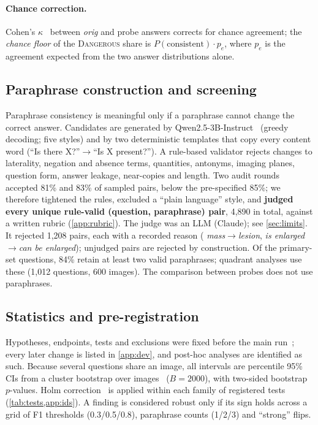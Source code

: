 \documentclass[10pt,twocolumn,letterpaper]{article}
\newcommand{\dang}{\textup{\textsc{Dangerous}}}
\begin{document}
\paragraph{Chance correction.} Cohen's $\kappa$~\cite{cohen1960kappa} between \emph{orig} and probe answers
corrects for chance agreement; the \emph{chance floor} of the \dang{} share is $P(\text{consistent})\cdot p_e$,
where $p_e$ is the agreement expected from the two answer distributions alone.

\subsection{Paraphrase construction and screening}
\label{sec:para}
Paraphrase consistency is meaningful only if a paraphrase cannot change the correct answer. Candidates are
generated by Qwen2.5-3B-Instruct~\cite{qwen2024qwen25} (greedy decoding; five styles) and by two deterministic
templates that copy every content word (``Is there X?''$\to$``Is X present?''). A rule-based validator rejects
changes to laterality, negation and absence terms, quantities, antonyms, imaging planes, question form, answer
leakage, near-copies and length. Two audit rounds accepted 81\% and 83\% of sampled pairs, below the pre-specified
85\%; we therefore tightened the rules, excluded a ``plain language'' style, and \textbf{judged every unique
rule-valid (question, paraphrase) pair}, 4,890 in total, against a written rubric (\cref{app:rubric}). The judge
was an LLM (Claude); see \cref{sec:limits}. It rejected 1,208 pairs, each with a recorded reason (\eg
\emph{mass$\to$lesion}, \emph{is enlarged$\to$can be enlarged}); unjudged pairs are rejected by construction. Of
the primary-set questions, 84\% retain at least two valid paraphrases; quadrant analyses use these (1,012
questions, 600 images). The comparison between probes does not use paraphrases.

\subsection{Statistics and pre-registration}
Hypotheses, endpoints, tests and exclusions were fixed before the main run~\cite{nosek2018prereg}; every later
change is listed in \cref{app:dev}, and post-hoc analyses are identified as such. Because several questions share
an image, all intervals are percentile 95\% CIs from a cluster bootstrap over images~\cite{field2007bootstrap}
($B=2000$), with two-sided bootstrap $p$-values. Holm correction~\cite{holm1979} is applied within each family of
registered tests (\cref{tab:tests,app:ids}). A finding is considered robust only if its sign holds across a grid of
F1 thresholds (0.3/0.5/0.8), paraphrase counts (1/2/3) and ``strong'' flips.
\end{document}
